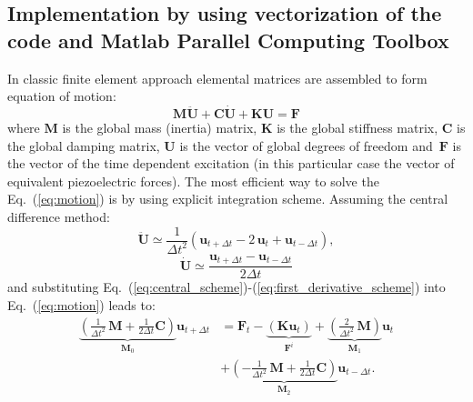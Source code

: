 \documentclass[preprint,12pt]{elsarticle}
\renewcommand{\vec}[1]{\mathbf{#1}}
\renewcommand{\bm}[1]{\mathbf{#1}}
\begin{document}
	\subsection{Implementation by using vectorization of the code and Matlab Parallel Computing Toolbox}
	In classic finite element approach elemental matrices are assembled to form equation of motion:
	\begin{equation}
	\bm{M} \vec{\ddot{U}} + \bm{C} \vec{\dot{U}} + \bm{K} \vec{U} = \vec{F} \label{eq:motion}
	\end{equation}  
	where $ \bm{M} $ is the global mass (inertia) matrix, $ \bm{K} $ is the global stiffness matrix,  $\bm{C} $ is the global damping matrix, $\vec{U}$ is the vector of global degrees of freedom and~$\vec{F}$ is the vector of the time dependent excitation (in this particular case the vector of equivalent piezoelectric forces). The most efficient way to solve the Eq.~(\ref{eq:motion}) is by using explicit integration scheme. Assuming the central difference method:
	\begin{equation}
	\ddot{\vec{U}}\simeq \frac{1}{\Delta t^2} \left(\vec{u}_{t+\Delta t} - 2\,\vec{u}_t + \vec{u}_{t-\Delta t}\right), \label{eq:central_scheme}
	\end{equation}
	\begin{equation}
	\dot{\vec{U}}\simeq \frac{\vec{u}_{t+\Delta t} -\vec{u}_{t-\Delta t}}{2 \Delta t}
	\label{eq:first_derivative_scheme}
	\end{equation}
	and substituting Eq.~(\ref{eq:central_scheme})-(\ref{eq:first_derivative_scheme}) into Eq.~(\ref{eq:motion}) leads to:
	\begin{equation}
	\begin{split}
	\underbrace{\left(\frac{1}{\Delta t^2} \,\bm{M} + \frac{1}{2 \Delta t} \bm{C}\right)}_{\vec{M}_0} \vec{u}_{t+\Delta t} &= \vec{F}_t - \underbrace{\left(\bm{K} \vec{u}_t\right)}_{\vec{F}^i} + \underbrace{\left(\frac{2}{\Delta t^2} \,\bm{M} \right)}_{\vec{M}_1}\vec{u}_t \\
	&+ \underbrace{\left(- \frac{1}{\Delta t^2} \,\bm{M} + \frac{1}{2 \Delta t} \bm{C}\right)}_{\vec{M}_2} \vec{u}_{t-\Delta t}.
	\label{eq:explicit_integration}
	\end{split}
	\end{equation}
\end{document}

